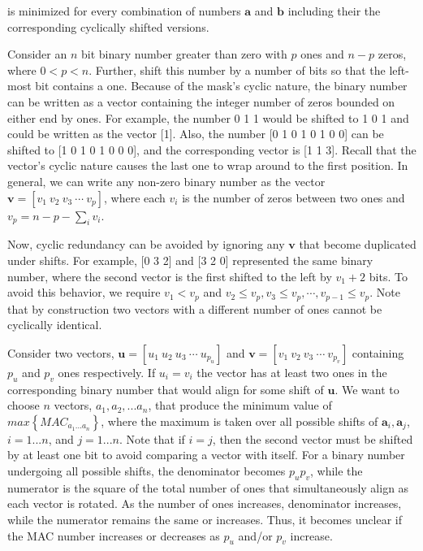 \documentclass[3p,times]{elsarticle}
\begin{document}
\noindent is minimized for every combination of numbers $\textbf{a}$ and $\textbf{b}$ including their the corresponding cyclically shifted versions.

Consider an $n$ bit binary number greater than zero with $p$ ones and $n-p$ zeros, where $0<p<n$.  
Further, shift this number by a number of bits so that the left-most bit contains a one.  
Because of the mask's cyclic nature, the binary number can be written as a vector containing the integer number of zeros bounded on either end by ones.  
For example, the number 0 1 1 would be shifted to 1 0 1 and could be written as the vector [1].  
Also, the number [0 1 0 1 0 1 0 0] can be shifted to [1 0 1 0 1 0 0 0], and the corresponding vector is [1 1 3].  
Recall that the vector's cyclic nature causes the last one to wrap around to the first 
position.  
In general, we can write any non-zero binary number as the vector $\textbf{v}=\left[v_1\ v_2\ v_3\ \cdots\ v_p\right]$, where each $v_i$ is the number of zeros between two ones and $v_p=n-p-\sum\limits_{i} v_i$.  

Now, cyclic redundancy can be avoided by ignoring any $\textbf{v}$ that become duplicated under shifts.  
For example, [0 3 2] and [3 2 0] represented the same binary number, where the second vector is the first shifted to the left by $v_1+2$ bits.  
To avoid this behavior, we require $v_{1}<v_p$ and $v_2\le v_p, v_3\le v_p, \cdots, v_{p-1}\le v_p$.  
Note that by construction two vectors with a different number of ones cannot be cyclically identical.

Consider two vectors, $\textbf{u}=\left[u_1\ u_2\ u_3\ \cdots\ u_{p_u}\right]$ and $\textbf{v}=\left[v_1\ v_2\ v_3\ \cdots\ v_{p_v}\right]$ containing $p_u$ and $p_v$ ones respectively.  
If $u_i=v_i$ the vector has at least two ones in the corresponding binary number that would align for some shift of $\textbf{u}$.  
We want to choose $n$ vectors, $a_1, a_2, ... a_n$, that produce the minimum value of $max\left\{MAC_{a_1...a_n}\right\}$, where the maximum is taken over all possible shifts of $\textbf{a}_i, \textbf{a}_j$, $i=1...n$, and $j=1...n$.  
Note that if $i=j$, then the second vector must be shifted by at least one bit to avoid comparing a vector with itself.  
For a binary number undergoing all possible shifts, the denominator becomes $p_u p_v$, while the numerator is the square of the total number of ones that simultaneously align as each vector is rotated.  
As the number of ones increases, denominator increases, while the numerator remains the same or increases.   
Thus, it becomes unclear if the MAC number increases or decreases as $p_u$ and/or $p_v$ increase.
\end{document}
